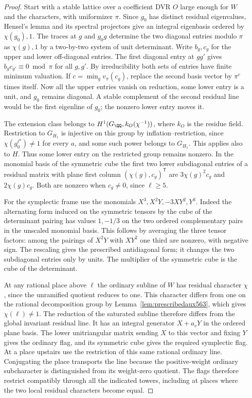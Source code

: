 \documentclass[a4paper,11pt]{article}
\theoremstyle{definition}
\theoremstyle{remark}
\numberwithin{equation}{section}
\begin{document}
\begin{proof}
Start with a stable lattice over a coefficient DVR \(O\)
large enough for \(W\) and the characters, with uniformizer
\(\pi\). Since \(g_0\) has distinct residual eigenvalues,
Hensel's lemma and its spectral projectors give an integral
eigenbasis ordered by \(\chi(g_0),1\). The traces at \(g\)
and \(g_0g\) determine the two diagonal entries modulo \(\pi\)
as \(\chi(g),1\) by a two-by-two system of unit determinant.
Write \(b_g,c_g\) for the upper and lower off-diagonal entries.
The first diagonal entry at \(gg'\) gives
\(b_gc_{g'}\equiv0\bmod\pi\) for all \(g,g'\).
By irreducibility both sets of entries have finite minimum
valuation. If \(c=\min_g v_\pi(c_g)\), replace the second
basis vector by \(\pi^c\) times itself. Now all the upper
entries vanish on reduction, some lower entry is a unit,
and \(g_0\) remains diagonal. A stable complement of the
second residual line would be the first eigenline of \(g_0\);
the nonzero lower entry moves it.

The extension class belongs to \(H^1(G_\QQ,k_O(\chi^{-1}))\),
where \(k_O\) is the residue field. Restriction to \(G_{H_1}\)
is injective on this group by inflation--restriction, since
\(\chi(g_0^{\ell^a})\ne1\) for every \(a\), and some such
power belongs to \(G_{H_1}\). This applies also to \(H\).
Thus some lower entry on the restricted group remains
nonzero. In the monomial basis of the symmetric cube the
first two lower subdiagonal entries of a residual matrix
with plane first column \((\chi(g),c_g)^{\mathsf T}\) are
\(3\chi(g)^2c_g\) and \(2\chi(g)c_g\). Both are nonzero
when \(c_g\ne0\), since \(\ell\ge5\).

For the symplectic frame use the monomials
\(X^3,X^2Y,-3XY^2,Y^3\). Indeed the alternating form induced
on the symmetric tensors by the cube of the determinant
pairing has values \(1,-1/3\) on the two ordered complementary
pairs in the unscaled monomial basis. This follows by
averaging the three tensor factors: among the pairings of
\(X^2Y\) with \(XY^2\) one third are nonzero, with negative
sign. The rescaling gives the prescribed antidiagonal form;
it changes the two subdiagonal entries only by units. The
multiplier of the symmetric cube is the cube of the determinant.

At any rational place above \(\ell\) the ordinary subline
of \(W\) has residual character \(\chi\), since the unramified
quotient reduces to one. This character differs from one
on the rational decomposition group by
Lemma~\ref{lem:prescribedaux563}, which gives
\(\chi(\ell)\ne1\). The reduction of the saturated subline
therefore differs from the global invariant residual line.
It has an integral generator \(X+a_vY\) in the ordered plane
basis. The lower unitriangular matrix sending \(X\) to this
vector and fixing \(Y\) gives the ordinary flag, and its
symmetric cube gives the required symplectic flag. At a
place upstairs use the restriction of this same rational
ordinary line. Conjugating the place transports the line
because the positive-weight ordinary subcharacter is
distinguished from its weight-zero quotient. The flags
therefore restrict compatibly through all the indicated
towers, including at places where the two local residual
characters become equal.
\end{proof}
\end{document}

